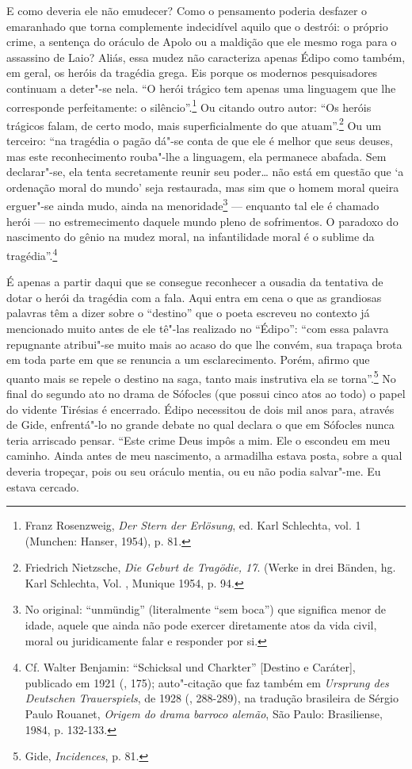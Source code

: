 E como deveria ele não emudecer? Como o pensamento poderia desfazer o
emaranhado que torna complemente indecidível aquilo que o destrói: o
próprio crime, a sentença do oráculo de Apolo ou a maldição que ele
mesmo roga para o assassino de Laio? Aliás, essa mudez não caracteriza
apenas Édipo como também, em geral, os heróis da tragédia grega. Eis
porque os modernos pesquisadores continuam a deter"-se nela. ``O herói
trágico tem apenas uma linguagem que lhe corresponde perfeitamente: o
silêncio''.\footnote{Franz Rosenzweig, \emph{Der Stern der
  Erlösung}, ed. Karl Schlechta, vol. 1 (Munchen: Hanser, 1954), p. 81. \versal{[N. E.]}}
Ou citando outro autor: ``Os heróis trágicos falam, de certo modo, mais
superficialmente do que atuam''.\footnote{Friedrich Nietzsche,
  \emph{Die Geburt de Tragödie, 17}. (Werke in drei Bänden, hg.
  Karl Schlechta, Vol. , Munique 1954, p. 94. \versal{[N. E.]}} Ou um terceiro: ``na
tragédia o pagão dá"-se conta de que ele é melhor que seus deuses, mas
este reconhecimento rouba"-lhe a linguagem, ela permanece abafada. Sem
declarar"-se, ela tenta secretamente reunir seu poder\ldots{} não está em
questão que `a ordenação moral do mundo' seja restaurada, mas sim que o
homem moral queira erguer"-se ainda mudo, ainda na menoridade\footnote{No original: ``unmündig'' (literalmente ``sem boca'') que significa
  menor de idade, aquele que ainda não pode exercer diretamente atos da
  vida civil, moral ou juridicamente falar e responder por si. \versal{[N. T.]}} ---
enquanto tal ele é chamado herói --- no estremecimento daquele mundo
pleno de sofrimentos. O paradoxo do nascimento do gênio na mudez moral,
na infantilidade moral é o sublime da tragédia''.\footnote{Cf.
  Walter Benjamin: ``Schicksal und Charkter'' {[}Destino e Caráter{]},
  publicado em 1921 (, 175); auto"-citação que faz também em
  \emph{Ursprung des Deutschen Trauerspiels}, de 1928 (, 288-289),
  na tradução brasileira de Sérgio Paulo Rouanet, \emph{Origem do drama
  barroco alemão}, São Paulo: Brasiliense, 1984, p. 132-133. \versal{[N. T.]}}

É apenas a partir daqui que se consegue reconhecer a ousadia da
tentativa de dotar o herói da tragédia com a fala. Aqui entra em cena o
que as grandiosas palavras têm a dizer sobre o ``destino'' que o poeta
escreveu no contexto já mencionado muito antes de ele tê"-las realizado
no ``Édipo'': ``com essa palavra repugnante atribui"-se muito mais ao
acaso do que lhe convém, sua trapaça brota em toda parte em que se
renuncia a um esclarecimento. Porém, afirmo que quanto mais se repele o
destino na saga, tanto mais instrutiva ela se torna''.\footnote{Gide, \emph{Incidences}, p. 81. \versal{[N. T.]}} No final do segundo ato no drama de
Sófocles (que possui cinco atos ao todo) o papel do vidente Tirésias é
encerrado. Édipo necessitou de dois mil anos para, através de Gide,
enfrentá"-lo no grande debate no qual declara o que em Sófocles nunca
teria arriscado pensar. ``Este crime Deus impôs a mim. Ele o escondeu em
meu caminho. Ainda antes de meu nascimento, a armadilha estava posta,
sobre a qual deveria tropeçar, pois ou seu oráculo mentia, ou eu não
podia salvar"-me. Eu estava cercado.

